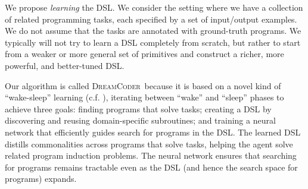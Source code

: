 \documentclass{article}
\newcommand{\system}{\textsc{DreamCoder}~}
\newcommand{\systemEnding}{\textsc{DreamCoder}}
\begin{document}
We propose \emph{learning} the DSL. We consider the setting where we
have a collection of related programming tasks, each specified by a
set of input/output examples. We do not assume that the tasks are
annotated with ground-truth programs. We typically will not try to
learn a DSL completely from scratch, but rather to start from a weaker
or more general set of primitives and
construct a richer, more powerful, and better-tuned DSL.

Our algorithm is called \system because it is based on a
novel kind of ``wake-sleep'' learning (c.f. \cite{hinton1995wake}), iterating
between ``wake'' and ``sleep'' phases to achieve three goals: finding
programs that solve tasks; creating a DSL by discovering
and reusing domain-specific subroutines; and training a neural network
that efficiently guides search for programs in the DSL. The learned DSL
distills commonalities across programs that solve tasks, helping
the agent solve related program induction problems. The neural
network ensures that searching for programs remains tractable
even as the DSL (and hence the search space for programs) expands.


\end{document}
